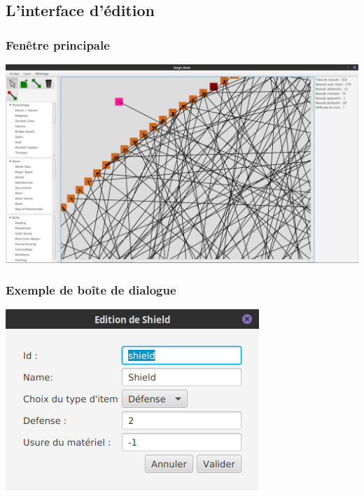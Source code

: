 \documentclass[beamer]{BetterDocument}
\begin{document}
	\subsection{L'interface d'édition}
	\begin{frame}
		\frametitle{Fenêtre principale}

		\center\includegraphics[width=0.8\paperwidth, keepaspectratio]{img/editeur.png}
	\end{frame}

	\begin{frame}
		\frametitle{Exemple de boîte de dialogue}

		\center\includegraphics[width=0.4\paperwidth, keepaspectratio]{img/editeur_item.png}
	\end{frame}
\end{document}
